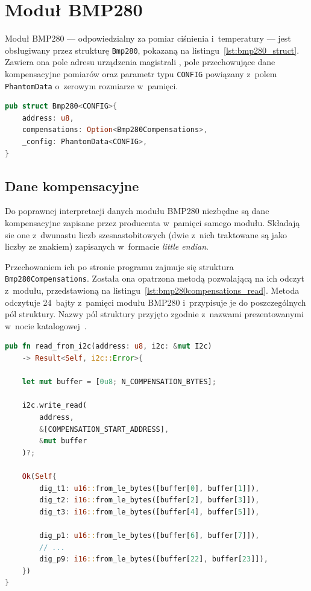 \section{Moduł BMP280}
Moduł BMP280 --- odpowiedzialny za pomiar ciśnienia
i~temperatury --- jest obsługiwany przez strukturę \texttt{Bmp280},
pokazaną na listingu~\ref{lst:bmp280_struct}. Zawiera ona pole
adresu urządzenia magistrali \isqrc, pole przechowujące dane
kompensacyjne pomiarów oraz parametr typu \texttt{CONFIG} powiązany
z~polem \texttt{PhantomData} o~zerowym rozmiarze w~pamięci.

\begin{lstlisting}[language=Rust, style=colouredRust, 
    caption={Struktura \texttt{Bmp280}},
    label={lst:bmp280_struct}
]
pub struct Bmp280<CONFIG>{
    address: u8,
    compensations: Option<Bmp280Compensations>,
    _config: PhantomData<CONFIG>,
}
\end{lstlisting}

\subsection*{Dane kompensacyjne}
Do poprawnej interpretacji danych modułu BMP280 niezbędne są dane kompensacyjne
zapisane przez producenta w~pamięci samego modułu.
Składają sie one z~dwunastu liczb szesnastobitowych (dwie z~nich traktowane są
jako liczby ze znakiem) zapisanych w~formacie \textit{little endian}.

Przechowaniem ich po stronie programu zajmuje się struktura 
\texttt{Bmp280Compensations}.
Została ona opatrzona metodą pozwalającą na ich odczyt z~modułu, przedstawioną 
na listingu~\ref{lst:bmp280compensations_read}.
Metoda odczytuje 24~bajty z~pamięci modułu BMP280 i~przypisuje je do 
poszczególnych pól struktury. Nazwy pól struktury przyjęto zgodnie z~nazwami
prezentowanymi w~nocie katalogowej~\cite{bmp280_datasheet}.

\begin{lstlisting}[language=Rust, style=colouredRust, 
    caption={Odczyt danych kompensacyjnych dla modułu BMP280},
    label={lst:bmp280compensations_read}
]
pub fn read_from_i2c(address: u8, i2c: &mut I2c) 
    -> Result<Self, i2c::Error>{

    let mut buffer = [0u8; N_COMPENSATION_BYTES];

    i2c.write_read(
        address, 
        &[COMPENSATION_START_ADDRESS], 
        &mut buffer
    )?;

    Ok(Self{
        dig_t1: u16::from_le_bytes([buffer[0], buffer[1]]),
        dig_t2: i16::from_le_bytes([buffer[2], buffer[3]]),
        dig_t3: i16::from_le_bytes([buffer[4], buffer[5]]),

        dig_p1: u16::from_le_bytes([buffer[6], buffer[7]]),
        // ...
        dig_p9: i16::from_le_bytes([buffer[22], buffer[23]]),
    })
}
\end{lstlisting}

